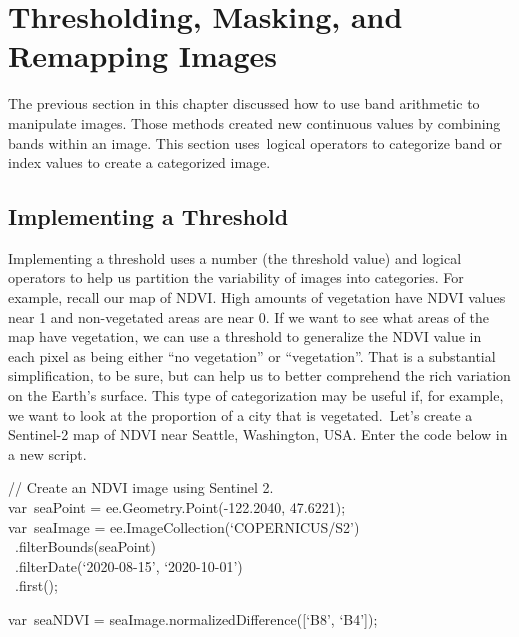 \documentclass[
  letterpaper,
  DIV=11,
  numbers=noendperiod]{scrreprt}
\begin{document}
\hypertarget{thresholding-masking-and-remapping-images}{%
\section{Thresholding, Masking, and Remapping
Images}\label{thresholding-masking-and-remapping-images}}

The previous section in this chapter discussed how to use band
arithmetic to manipulate images. Those methods created new continuous
values by combining bands within an image. This section uses~logical
operators to categorize band or index values to create a categorized
image.

\hypertarget{implementing-a-threshold}{%
\subsection{Implementing a Threshold}\label{implementing-a-threshold}}

Implementing a threshold uses a number (the threshold value) and logical
operators to help us partition the variability of images into
categories. For example, recall our map of NDVI. High amounts of
vegetation have NDVI values near 1 and non-vegetated areas are near 0.
If we want to see what areas of the map have vegetation, we can use a
threshold to generalize the NDVI value in each pixel as being either
``no vegetation'' or ``vegetation''. That is a substantial
simplification, to be sure, but can help us to better comprehend the
rich variation on the Earth's surface. This type of categorization may
be useful if, for example, we want to look at the proportion of a city
that is vegetated.~Let's create a Sentinel-2 map of NDVI near Seattle,
Washington, USA. Enter the code below in a new script.

// Create an NDVI image using Sentinel 2.\\
var~seaPoint = ee.Geometry.Point(-122.2040, 47.6221);\\
var~seaImage = ee.ImageCollection(`COPERNICUS/S2')\\
\hspace*{0.333em} ~.filterBounds(seaPoint)\\
\hspace*{0.333em} ~.filterDate(`2020-08-15', `2020-10-01')\\
\hspace*{0.333em} ~.first();

var~seaNDVI = seaImage.normalizedDifference({[}`B8', `B4'{]});
\end{document}
